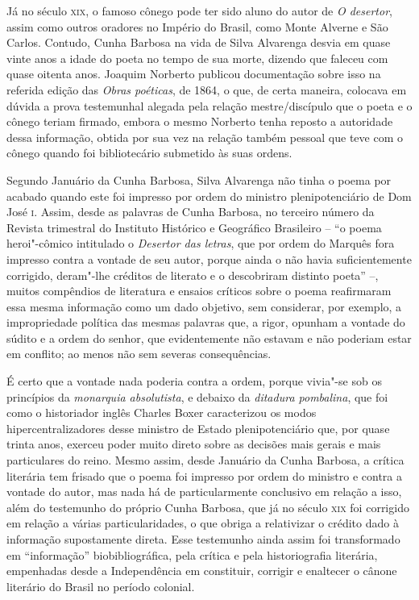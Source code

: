 Já no século \textsc{xix}, o famoso cônego pode ter sido aluno do autor de \textit{O
desertor}, assim como outros oradores no Império do Brasil, como Monte Alverne e
São Carlos. Contudo, Cunha Barbosa na vida de Silva Alvarenga desvia em quase
vinte anos a idade do poeta no tempo de sua morte, dizendo que faleceu com quase
oitenta anos. Joaquim Norberto publicou documentação sobre isso na referida
edição das \textit{Obras poéticas}, de 1864, o que, de certa maneira, colocava
em dúvida a prova testemunhal alegada pela relação mestre/discípulo que o poeta
e o cônego teriam firmado, embora o mesmo Norberto tenha reposto a autoridade
dessa informação, obtida por sua vez na relação também pessoal que teve com o
cônego quando foi bibliotecário submetido às suas ordens.

Segundo Januário da Cunha Barbosa, Silva Alvarenga não tinha o poema por acabado
quando este foi impresso por ordem do ministro plenipotenciário de Dom José
\textsc{i}. Assim, desde as palavras de Cunha Barbosa, no terceiro número da
Revista trimestral do Instituto Histórico e Geográfico Brasileiro -- ``o poema
heroi"-cômico intitulado o \textit{Desertor das letras}, que por ordem do Marquês
fora impresso contra a vontade de seu autor, porque ainda o não havia
suficientemente corrigido, deram"-lhe créditos de literato e o descobriram
distinto poeta'' --, muitos compêndios de literatura e ensaios críticos sobre o
poema reafirmaram essa mesma informação como um dado objetivo, sem considerar,
por exemplo, a impropriedade política das mesmas palavras que, a rigor, opunham
a vontade do súdito e a ordem do senhor, que evidentemente não estavam e não
poderiam estar em conflito; ao menos não sem severas consequências.

É certo que a vontade nada poderia contra a ordem, porque vivia"-se sob os
princípios da \textit{monarquia absolutista}, e debaixo da \textit{ditadura
pombalina}, que foi como o historiador inglês Charles Boxer caracterizou os
modos hipercentralizadores desse ministro de Estado plenipotenciário que, por
quase trinta anos, exerceu poder muito direto sobre as decisões mais gerais e
mais particulares do reino.  Mesmo assim, desde Januário da Cunha Barbosa, a
crítica literária tem frisado que o poema foi impresso por ordem do ministro e
contra a vontade do autor, mas nada há de particularmente conclusivo em relação
a isso, além do testemunho do próprio Cunha Barbosa, que já no século
\textsc{xix} foi corrigido em relação a várias particularidades, o que obriga a
relativizar o crédito dado à informação supostamente direta.  Esse testemunho
ainda assim foi transformado em ``informação'' biobibliográfica, pela crítica e
pela historiografia literária, empenhadas desde a Independência em constituir,
corrigir e enaltecer o cânone literário do Brasil no período colonial.

